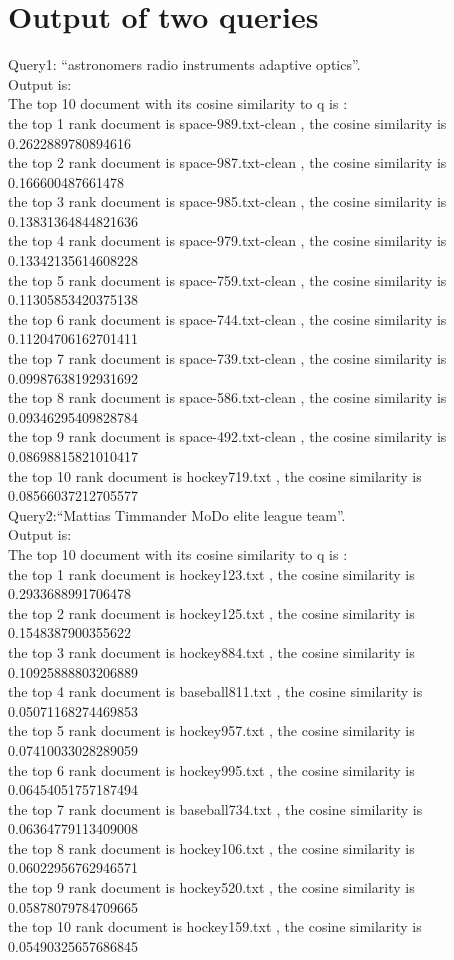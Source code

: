 \documentclass{article}
\begin{document}
\section{Output of two queries}
Query1: ``astronomers radio instruments adaptive optics''.\\
Output is:\\
The top 10 document with its cosine similarity to q is :\\
the top 1 rank document is space-989.txt-clean , the cosine similarity is 0.2622889780894616\\
the top 2 rank document is space-987.txt-clean , the cosine similarity is 0.166600487661478\\
the top 3 rank document is space-985.txt-clean , the cosine similarity is 0.13831364844821636\\
the top 4 rank document is space-979.txt-clean , the cosine similarity is 0.13342135614608228\\
the top 5 rank document is space-759.txt-clean , the cosine similarity is 0.11305853420375138\\
the top 6 rank document is space-744.txt-clean , the cosine similarity is 0.11204706162701411\\
the top 7 rank document is space-739.txt-clean , the cosine similarity is 0.09987638192931692\\
the top 8 rank document is space-586.txt-clean , the cosine similarity is 0.09346295409828784\\
the top 9 rank document is space-492.txt-clean , the cosine similarity is 0.08698815821010417\\
the top 10 rank document is hockey719.txt , the cosine similarity is 0.08566037212705577\\

Query2:``Mattias Timmander MoDo elite league team''.\\
Output is:\\
The top 10 document with its cosine similarity to q is :\\
the top 1 rank document is hockey123.txt , the cosine similarity is 0.2933688991706478\\
the top 2 rank document is hockey125.txt , the cosine similarity is 0.1548387900355622\\
the top 3 rank document is hockey884.txt , the cosine similarity is 0.10925888803206889\\
the top 4 rank document is baseball811.txt , the cosine similarity is 0.05071168274469853\\
the top 5 rank document is hockey957.txt , the cosine similarity is 0.07410033028289059\\
the top 6 rank document is hockey995.txt , the cosine similarity is 0.06454051757187494\\
the top 7 rank document is baseball734.txt , the cosine similarity is 0.06364779113409008\\
the top 8 rank document is hockey106.txt , the cosine similarity is 0.06022956762946571\\
the top 9 rank document is hockey520.txt , the cosine similarity is 0.05878079784709665\\
the top 10 rank document is hockey159.txt , the cosine similarity is 0.05490325657686845\\
\end{document}
